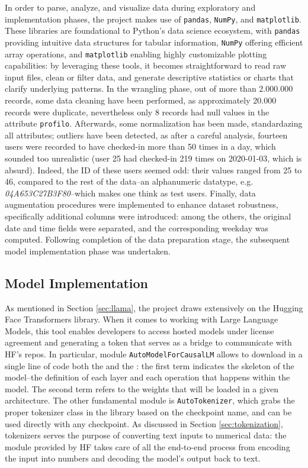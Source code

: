 In order to parse, analyze, and visualize data during exploratory and implementation phases, the project makes use of \verb|pandas|, \verb|NumPy|, and \verb|matplotlib|. These libraries are foundational to Python’s data science ecosystem, with \verb|pandas| providing intuitive data structures for tabular information, \verb|NumPy| offering efficient array operations, and \verb|matplotlib| enabling highly customizable plotting capabilities: by leveraging these tools, it becomes straightforward to read raw input files, clean or filter data, and generate descriptive statistics or charts that clarify underlying patterns.
In the wrangling phase, out of more than 2.000.000 records, some data cleaning have been performed, as approximately 20.000 records were duplicate, nevertheless only 8 records had null values in the attribute \verb|profilo|. Afterwards, some normalization has been made, standardazing all attributes; outliers have been detected, as after a careful analysis, fourteen users were recorded to have checked-in more than 50 times in a day, which sounded too unrealistic (user 25 had checked-in 219 times on 2020-01-03, which is absurd). Indeed, the ID of these users seemed odd: their values ranged from 25 to 46, compared to the rest of the data--an alphanumeric datatype, e.g. \textit{04A653C27B3F80}--which makes one think as test users. Finally, data augmentation procedures were implemented to enhance dataset robustness, specifically additional columns were introduced: among the others, the original date and time fields were separated, and the corresponding weekday was computed.
Following completion of the data preparation stage, the subsequent model implementation phase was undertaken.


\subsection{Model Implementation}
\label{sec:model-implementation}

As mentioned in Section \ref{sec:llama}, the project draws extensively on the Hugging Face Transformers library. When it comes to working with Large Language Models, this tool enables developers to access hosted models under license agreement and generating a token that serves as a bridge to communicate with HF's repos. In particular, module \verb|AutoModelForCausalLM| allows to download in a single line of code both the  and the : the first term indicates the skeleton of the model--the definition of each layer and each operation that happens within the model. The second term refers to the weights that will be loaded in a given architecture.
The other fundamental module is \verb|AutoTokenizer|, which grabs the proper tokenizer class in the library based on the checkpoint name, and can be used directly with any checkpoint. As discussed in Section \ref{sec:tokenization}, tokenizers serves the purpose of converting text inputs to numerical data: the module provided by HF takes care of all the end-to-end process from encoding the input into numbers and decoding the model's output back to text.

